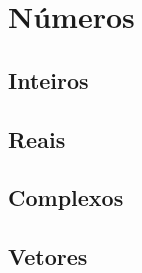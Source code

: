 \chapter{Números}

    \section*{Inteiros}

    \section*{Reais}

    \section*{Complexos}

    \section*{Vetores}
    
    